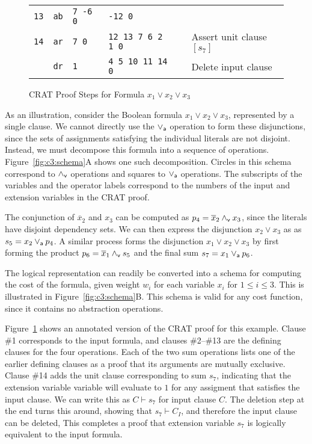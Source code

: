 \documentclass{llncs}
\newcommand{\pand}{\mathbin{\land_{\sf v}}}
\newcommand{\por}{\mathbin{\lor_{\sf a}}}
\newcommand{\tautology}{1}
\newcommand{\obar}[1]{\overline{#1}}
\newcommand{\turnstile}{\vdash}
\begin{document}
\begin{figure}
{\begin{tabular}{llllll}
    {\tt 13} & {\tt ab}  & {\tt  7 -6 0}    & {\tt -12 0} & &  \\  %
    {\tt 14} & {\tt ar}  & {\tt 7 0} & {\tt 12 13 7 6 2 1 0} & & Assert unit clause $[s_7]$ \\
             & {\tt dr}  & {\tt 1}  & {\tt 4 5 10 11 14 0} & & Delete input clause \\
  \end{tabular}
  }
  \caption{CRAT Proof Steps for Formula $x_1 \lor x_2 \lor x_3$}
  \label{fig:c3:crat}
\end{figure}
    
As an illustration, consider the Boolean formula $x_1 \lor x_2 \lor
x_3$, represented by a single clause.  We cannot directly use the
$\por$ operation to form these disjunctions, since the sets of assignments
satisfying the individual literals are not disjoint.  Instead, we must
decompose this formula into a sequence of operations.  Figure~\ref{fig:c3:schema}A shows one such decomposition.
Circles in this schema
correspond to $\pand$ operations and squares to $\por$ operations.
The subscripts of the variables and the operator labels correspond to
the numbers of the input and extension variables in the CRAT proof.

The conjunction of $\obar{x}_2$ and $x_3$ can be computed as $p_4 =
\obar{x}_2 \pand x_3$, since the literals have disjoint dependency
sets. We can then express the disjunction $x_2 \lor x_3$ as
as $s_5 = x_2 \por p_4$.  A similar process forms the
disjunction $x_1 \lor x_2 \lor x_3$ by first forming the product $p_6
= \obar{x}_1 \pand s_5$ and the final sum $s_7 = x_1 \por p_6$.

The logical representation can readily be converted into a schema for
computing the cost of the formula, given weight $w_i$ for each
variable $x_i$ for $1 \leq i \leq 3$.  This is illustrated in
Figure~\ref{fig:c3:schema}B\@.  This schema is valid for any cost
function, since it contains no abstraction operations.

Figure~\ref{fig:c3:crat} shows an annotated version of the CRAT proof
for this example.  Clause \#1 corresponds to the input formula, and
clauses \#2--\#13 are the defining clauses for the four operations.
Each of the two sum operations lists one of the earlier defining
clauses as a proof that its arguments are mutually exclusive.
Clause \#14 adds the unit clause corresponding to sum $s_7$,
indicating that the extension variable variable will evaluate to
$\tautology$  for any assigment that satisfies the input clause.  We
can write this as $C \turnstile s_7$ for input clause $C$.  The
deletion step at the end turns this around, showing that $s_7
\turnstile C_I$, and therefore the input clause can be deleted, This
completes a proof that extension variable $s_7$ is logically
equivalent to the input formula.
\end{document}
